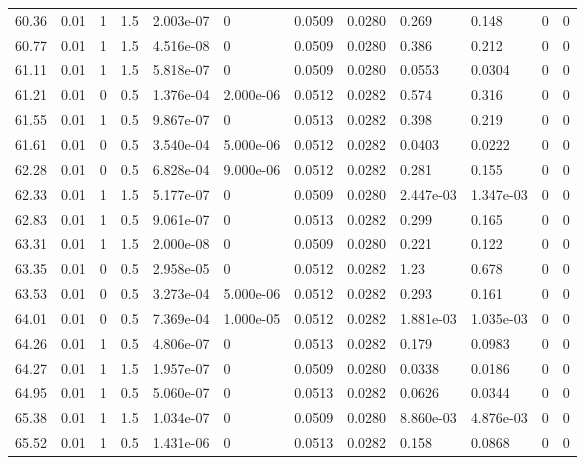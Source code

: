 \documentclass[preview]{standalone}
\begin{document}
{{{{{\begin{tabular}{L{1.2cm}C{1.2cm} C{0.3cm}C{0.5cm} C{1.4cm}C{1.4cm} C{1.4cm}C{1.4cm} C{1.6cm}C{1.6cm} C{1.6cm}C{1.6cm}}
  60.36  &  0.01  & 1     & 1.5 &  2.003e-07  & 0  &  0.0509&   0.0280& 0.269 & 0.148   &  0 & 0  \\ 
  60.77  &  0.01  & 1     & 1.5 &  4.516e-08  & 0  &  0.0509&   0.0280& 0.386 & 0.212   &  0 & 0  \\ 
  61.11  &  0.01  & 1     & 1.5 &  5.818e-07  & 0  &  0.0509&   0.0280& 0.0553 & 0.0304   &  0 & 0  \\ 
  61.21  &  0.01  & 0     & 0.5 &  1.376e-04  & 2.000e-06  &  0.0512&   0.0282& 0.574 & 0.316   &  0 & 0  \\ 
  61.55  &  0.01  & 1     & 0.5 &  9.867e-07  & 0  &  0.0513&   0.0282& 0.398 & 0.219   &  0 & 0  \\ 
  61.61  &  0.01  & 0     & 0.5 &  3.540e-04  & 5.000e-06  &  0.0512&   0.0282& 0.0403 & 0.0222   &  0 & 0  \\ 
  62.28  &  0.01  & 0     & 0.5 &  6.828e-04  & 9.000e-06  &  0.0512&   0.0282& 0.281 & 0.155   &  0 & 0  \\ 
  62.33  &  0.01  & 1     & 1.5 &  5.177e-07  & 0  &  0.0509&   0.0280& 2.447e-03 & 1.347e-03   &  0 & 0  \\ 
  62.83  &  0.01  & 1     & 0.5 &  9.061e-07  & 0  &  0.0513&   0.0282& 0.299 & 0.165   &  0 & 0  \\ 
  63.31  &  0.01  & 1     & 1.5 &  2.000e-08  & 0  &  0.0509&   0.0280& 0.221 & 0.122   &  0 & 0  \\ 
  63.35  &  0.01  & 0     & 0.5 &  2.958e-05  & 0  &  0.0512&   0.0282& 1.23 & 0.678   &  0 & 0  \\ 
  63.53  &  0.01  & 0     & 0.5 &  3.273e-04  & 5.000e-06  &  0.0512&   0.0282& 0.293 & 0.161   &  0 & 0  \\ 
  64.01  &  0.01  & 0     & 0.5 &  7.369e-04  & 1.000e-05  &  0.0512&   0.0282& 1.881e-03 & 1.035e-03   &  0 & 0  \\ 
  64.26  &  0.01  & 1     & 0.5 &  4.806e-07  & 0  &  0.0513&   0.0282& 0.179 & 0.0983   &  0 & 0  \\ 
  64.27  &  0.01  & 1     & 1.5 &  1.957e-07  & 0  &  0.0509&   0.0280& 0.0338 & 0.0186   &  0 & 0  \\ 
  64.95  &  0.01  & 1     & 0.5 &  5.060e-07  & 0  &  0.0513&   0.0282& 0.0626 & 0.0344   &  0 & 0  \\ 
  65.38  &  0.01  & 1     & 1.5 &  1.034e-07  & 0  &  0.0509&   0.0280& 8.860e-03 & 4.876e-03   &  0 & 0  \\ 
  65.52  &  0.01  & 1     & 0.5 &  1.431e-06  & 0  &  0.0513&   0.0282& 0.158 & 0.0868   &  0 & 0  \\ 

\end{tabular}}}}}}
\end{document}

